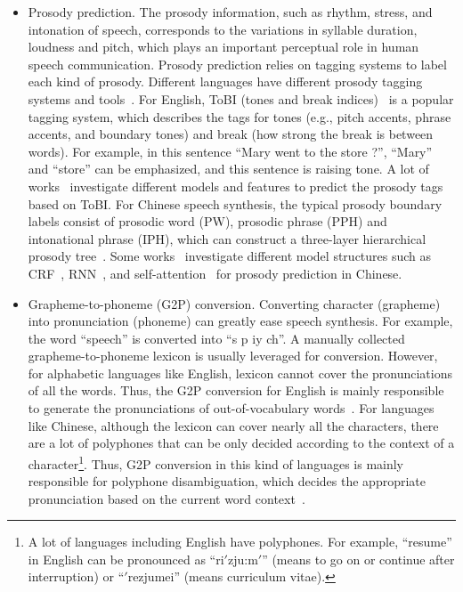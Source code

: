 \documentclass{article}
\begin{document}
\begin{itemize}[leftmargin=*]
    \item Prosody prediction. The prosody information, such as rhythm, stress, and intonation of speech, corresponds to the variations in syllable duration, loudness and pitch, which plays an important perceptual role in human speech communication. Prosody prediction relies on tagging systems to label each kind of prosody. Different languages have different prosody tagging systems and tools~\cite{silverman1992tobi,rosenberg2010autobi,taylor1998tilt,hirst2001automatic,obin2014slam}. For English, ToBI (tones and break indices)~\cite{silverman1992tobi,rosenberg2010autobi} is a popular tagging system, which describes the tags for tones (e.g., pitch accents, phrase accents, and boundary tones) and break (how strong the break is between words). For example, in this sentence ``Mary went to the store ?'', ``Mary'' and ``store'' can be emphasized, and this sentence is raising tone. A lot of works~\cite{sridhar2007exploiting,levow2008automatic,jeon2009automatic,qian2010automatic} investigate different models and features to predict the prosody tags based on ToBI. For Chinese speech synthesis, the typical prosody boundary labels consist of prosodic word (PW), prosodic phrase (PPH) and intonational phrase (IPH), which can construct a three-layer hierarchical prosody tree~\cite{chu2001locating,sun2009chinese,ding2015automatic}. Some works~\cite{chu2001locating,ai2020neural,ding2015automatic,sun2009chinese,lu2019self,lu2019implementing} investigate different model structures such as CRF~\cite{lafferty2001conditional}, RNN~\cite{hochreiter1997long}, and self-attention~\cite{vaswani2017attention} for prosody prediction in Chinese. 
    \item Grapheme-to-phoneme (G2P) conversion. Converting character (grapheme) into pronunciation (phoneme) can greatly ease speech synthesis. For example, the word ``speech'' is converted into ``s p iy ch''. A manually collected grapheme-to-phoneme lexicon is usually leveraged for conversion. However, for alphabetic languages like English, lexicon cannot cover the pronunciations of all the words. Thus, the G2P conversion for English is mainly responsible to generate the pronunciations of out-of-vocabulary words~\cite{chen2003conditional,bisani2008joint,yao2015sequence,rao2015grapheme,chae2018convolutional,sun2019token}. For languages like Chinese, although the lexicon can cover nearly all the characters, there are a lot of polyphones that can be only decided according to the context of a character\footnote{A lot of languages including English have polyphones. For example, ``resume'' in English can be pronounced as ``ri$'$zju:m$'$'' (means to go on or continue after interruption) or ``$'$rezjumei'' (means curriculum vitae).}. Thus, G2P conversion in this kind of languages is mainly responsible for polyphone disambiguation, which decides the appropriate pronunciation based on the current word context~\cite{zhang2002efficient,xu2004grapheme,mao2007inequality,shan2016bi,sun2019knowledge,cai2019polyphone,park2020g2pm}.
\end{itemize}
\end{document}

